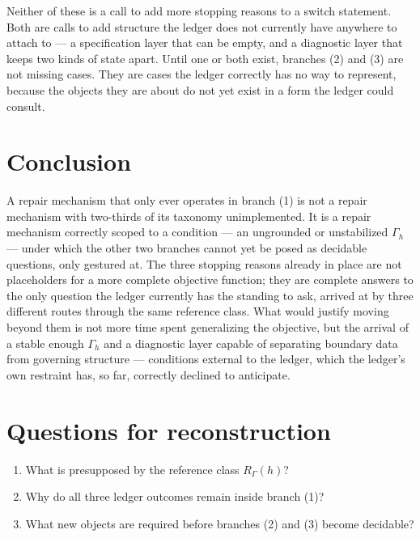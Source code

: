 \documentclass[11pt,openany]{book}
\begin{document}
Neither of these is a call to add more stopping reasons to a switch statement. Both are calls to add structure the ledger does not currently have anywhere to attach to — a specification layer that can be empty, and a diagnostic layer that keeps two kinds of state apart. Until one or both exist, branches (2) and (3) are not missing cases. They are cases the ledger correctly has no way to represent, because the objects they are about do not yet exist in a form the ledger could consult.

\section{Conclusion}

A repair mechanism that only ever operates in branch (1) is not a repair mechanism with two-thirds of its taxonomy unimplemented. It is a repair mechanism correctly scoped to a condition — an ungrounded or unstabilized $\Gamma_h$ — under which the other two branches cannot yet be posed as decidable questions, only gestured at. The three stopping reasons already in place are not placeholders for a more complete objective function; they are complete answers to the only question the ledger currently has the standing to ask, arrived at by three different routes through the same reference class. What would justify moving beyond them is not more time spent generalizing the objective, but the arrival of a stable enough $\Gamma_h$ and a diagnostic layer capable of separating boundary data from governing structure — conditions external to the ledger, which the ledger's own restraint has, so far, correctly declined to anticipate.

\section*{Questions for reconstruction}

\begin{enumerate}

\item What is presupposed by the reference class $R_\Gamma(h)$?

\item Why do all three ledger outcomes remain inside branch (1)?

\item What new objects are required before branches (2) and (3) become decidable?

\end{enumerate}
\end{document}
